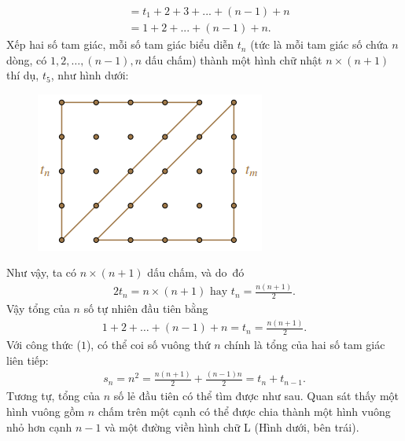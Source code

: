 \begin{multicols}{2}
\begin{align*}
			&= {t_1} + 2 + 3 + ... + \left( {n - 1} \right) + n\\
			&= 1 + 2 + ... + \left( {n - 1} \right) + n.
	\end{align*}
	Xếp hai số tam giác, mỗi số tam giác biểu diễn $t_n$ (tức là mỗi tam giác số chứa $n$  dòng, có $1,2,\ldots,\left( {n - 1} \right),n$ dấu chấm) thành một hình chữ nhật $n \times (n+1)$ thí  dụ, $t_5$,  như hình dưới:
	\begin{figure}[H]
		\vspace*{-5pt}
		\centering
		\captionsetup{labelformat= empty, justification=centering}
		\includegraphics[width= 0.65\linewidth]{8}
		\vspace*{-10pt}
	\end{figure}
	Như vậy, ta có  $n \times \left( {n + 1} \right)$ dấu chấm, và do~đó
	\begin{align*}
		2{t_n} = n \times \left( {n + 1} \right) \text{ hay } {t_n} = \frac{{n\left( {n + 1} \right)}}{2}.
	\end{align*}  
	Vậy tổng của $n$ số tự nhiên đầu tiên bằng
	\begin{align*}
		1 \!+\! 2 \!+\!\ldots\! +\! \left(\! n \!-\! 1 \!\right) \!+\! n \!=\! {t_n} \!=\! \frac{{n\left(\! {n \!+\! 1} \right)}}{2}. \tag{$1$}
	\end{align*}
	Với công thức ($1$), có thể coi số vuông thứ $n$  chính là tổng của hai số tam giác liên tiếp:
	\begin{align*}
		{s_n} = {n^2} = \frac{{n(n + 1)}}{2} + \frac{{\left( {n - 1} \right)n}}{2} = {t_n} + {t_{n - 1}}.
	\end{align*}
	Tương tự, tổng của $n$  số lẻ đầu tiên có thể tìm được như sau. Quan sát thấy một hình vuông gồm  $n$  chấm trên một cạnh có thể được chia thành một hình vuông nhỏ hơn cạnh $n-1$   và một đường viền hình chữ L (Hình dưới, bên trái). 
	\begin{figure}[H]

\end{figure}
\end{multicols}
